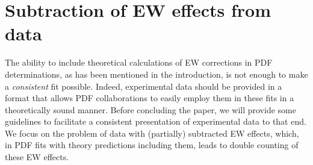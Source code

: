 \section{Subtraction of EW effects from data}
\label{sec:doublecounting}

The ability to include theoretical calculations of EW corrections in
PDF determinations, as has been mentioned in the introduction, is not enough to make a \emph{consistent} fit possible. Indeed, experimental data should
be provided in a format that allows PDF collaborations to easily employ them in these fits in a theoretically sound manner. Before concluding the paper,
we will provide some guidelines to facilitate a consistent presentation of experimental data to that end. We focus on the problem of data with (partially) subtracted EW effects, which, in PDF fits with theory predictions including them, leads to double counting of these EW effects.

